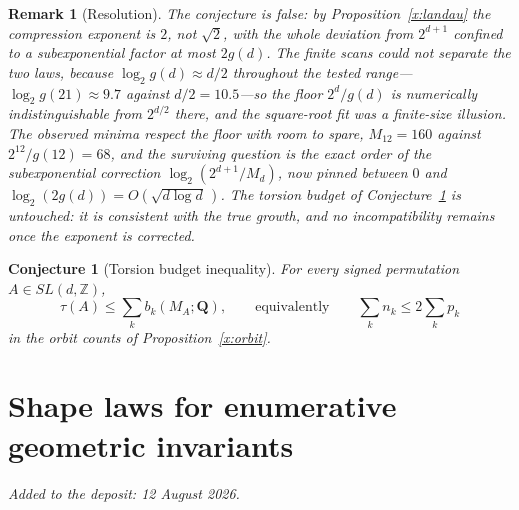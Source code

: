 \documentclass[11pt]{article}
\newtheorem{conjecture}{Conjecture}
\newtheorem{remark}{Remark}
\theoremstyle{definition}
\newcommand{\Z}{\mathbb Z}
\providecommand{\Z}{\mathbb Z}
\begin{document}
\begin{remark}[Resolution]\label{x19:res}
The conjecture is false: by Proposition~\ref{x:landau} the compression exponent is $2$, not $\sqrt2$, with the whole deviation from $2^{d+1}$ confined to a subexponential factor at most $2g(d)$.  The finite scans could not separate the two laws, because $\log_2g(d)\approx d/2$ throughout the tested range---$\log_2g(21)\approx9.7$ against $d/2=10.5$---so the floor $2^d/g(d)$ is numerically indistinguishable from $2^{d/2}$ there, and the square-root fit was a finite-size illusion.  The observed minima respect the floor with room to spare, $M_{12}=160$ against $2^{12}/g(12)=68$, and the surviving question is the exact order of the subexponential correction $\log_2(2^{d+1}/M_d)$, now pinned between $0$ and $\log_2(2g(d))=O(\sqrt{d\log d}\,)$.  The torsion budget of Conjecture~\ref{x20} is untouched: it is consistent with the true growth, and no incompatibility remains once the exponent is corrected.
\end{remark}

\begin{conjecture}[Torsion budget inequality]\label{x20}
For every signed permutation $A\in SL(d,\Z)$,
\[
\tau(A)\le\sum_kb_k(M_A;\mathbf Q),
\qquad\text{equivalently}\qquad
\sum_kn_k\le2\sum_kp_k
\]
in the orbit counts of Proposition~\ref{x:orbit}.
\end{conjecture}

\part{Shape laws for enumerative geometric invariants}

\medskip\noindent\emph{Added to the deposit: 12 August 2026.}\par\medskip
\end{document}

